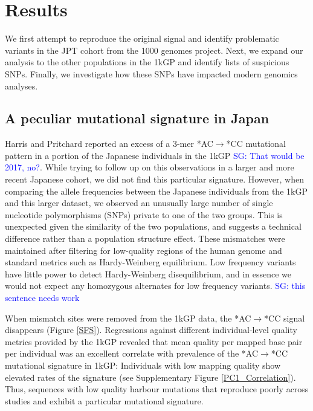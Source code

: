 \documentclass[9pt,lineno]{elife}
\newcommand{\sgcomment}[1]{\textcolor{blue}{SG: #1}}
\begin{document}
 
			

\section{Results}
We first attempt to reproduce the original signal and identify problematic variants in the JPT cohort from the 1000 genomes project. 
Next, we expand our analysis to the other populations in the 1kGP and identify lists of suspicious SNPs.
Finally, we investigate how these SNPs have impacted modern genomics analyses.  
			
\subsection{A peculiar mutational signature in Japan}			
	
Harris and Pritchard reported an excess of a 3-mer *AC${\rightarrow}$*CC mutational pattern in a portion of the Japanese individuals in the 1kGP \citep{Harris2015a} \sgcomment{That would be 2017, no?}.
While trying to follow up on this observations in a larger and more recent Japanese cohort, we did not find this particular signature.
However, when comparing the allele frequencies between the Japanese individuals from the 1kGP and this larger dataset, we observed an unusually large number of single nucleotide polymorphisms (SNPs) private to one of the two groups.
This is unexpected given the similarity of the two populations, and suggests a technical difference rather than a population structure effect. 
These mismatches were maintained after filtering for low-quality regions of the human genome and standard metrics such as Hardy-Weinberg equilibrium.
Low frequency variants have little power to detect Hardy-Weinberg disequilibrium, and in essence we would not expect any homozygous alternates for low frequency variants. \sgcomment{this sentence needs work}

When mismatch sites were removed from the 1kGP data, the  *AC${\rightarrow}$*CC signal disappears (Figure \ref{SFS}).
Regressions against different individual-level quality metrics provided by the 1kGP revealed that mean quality per mapped base pair per individual was an excellent correlate with prevalence of the  *AC${\rightarrow}$*CC mutational signature in 1kGP:
Individuals with low mapping quality show elevated rates of the signature (see Supplementary Figure \ref{PC1_Correlation}).
Thus, sequences with low quality harbour mutations that reproduce poorly across studies and exhibit a particular mutational signature. 
\end{document}
